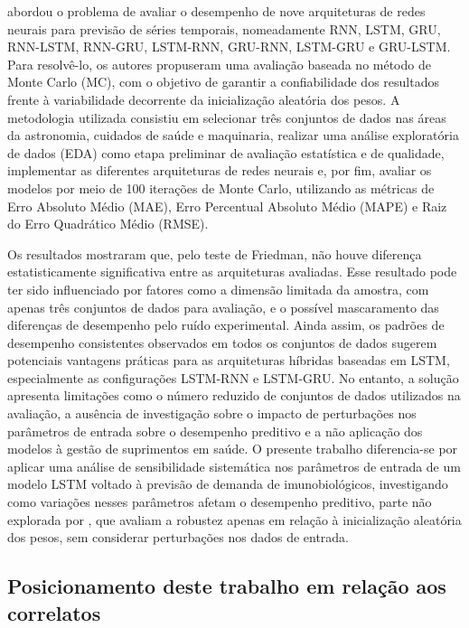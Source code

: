 \documentclass[
    12pt,
    openright,
    oneside,
    a4paper,
    english,
    brazil
]{abntex2}
\begin{document}
 abordou o problema de avaliar o desempenho de nove arquiteturas de redes neurais para previsão de séries temporais, nomeadamente RNN, LSTM, GRU, RNN-LSTM, RNN-GRU, LSTM-RNN, GRU-RNN, LSTM-GRU e GRU-LSTM. Para resolvê-lo, os autores propuseram uma avaliação baseada no método de Monte Carlo (MC), com o objetivo de garantir a confiabilidade dos resultados frente à variabilidade decorrente da inicialização aleatória dos pesos. A metodologia utilizada consistiu em selecionar três conjuntos de dados nas áreas da astronomia, cuidados de saúde e maquinaria, realizar uma análise exploratória de dados (EDA) como etapa preliminar de avaliação estatística e de qualidade, implementar as diferentes arquiteturas de redes neurais e, por fim, avaliar os modelos por meio de 100 iterações de Monte Carlo, utilizando as métricas de Erro Absoluto Médio (MAE), Erro Percentual Absoluto Médio (MAPE) e Raiz do Erro Quadrático Médio (RMSE).

Os resultados mostraram que, pelo teste de Friedman, não houve diferença estatisticamente significativa entre as arquiteturas avaliadas. Esse resultado pode ter sido influenciado por fatores como a dimensão limitada da amostra, com apenas três conjuntos de dados para avaliação, e o possível mascaramento das diferenças de desempenho pelo ruído experimental. Ainda assim, os padrões de desempenho consistentes observados em todos os conjuntos de dados sugerem potenciais vantagens práticas para as arquiteturas híbridas baseadas em LSTM, especialmente as configurações LSTM-RNN e LSTM-GRU. No entanto, a solução apresenta limitações como o número reduzido de conjuntos de dados utilizados na avaliação, a ausência de investigação sobre o impacto de perturbações nos parâmetros de entrada sobre o desempenho preditivo e a não aplicação dos modelos à gestão de suprimentos em saúde. O presente trabalho diferencia-se por aplicar uma análise de sensibilidade sistemática nos parâmetros de entrada de um modelo LSTM voltado à previsão de demanda de imunobiológicos, investigando como variações nesses parâmetros afetam o desempenho preditivo, parte não explorada por , que avaliam a robustez apenas em relação à inicialização aleatória dos pesos, sem considerar perturbações nos dados de entrada.

\subsection{Posicionamento deste trabalho em relação aos correlatos}
\end{document}
